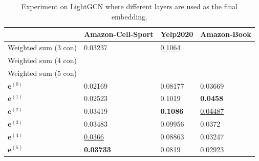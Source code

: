\begin{table}[]
    \begin{tabular}{|l|l|l|l|}
        \hline
                             & Amazon-Cell-Sport  & Yelp2020           & Amazon-Book         \\ \hline
        Weighted sum (3 con) & 0.03237            & \underline{0.1064} &                     \\ \hline
        Weighted sum (4 con) &                    &                    &                     \\ \hline
        Weighted sum (5 con) &                    &                    &                     \\ \hline
        $\mathbf{e}^{(0)}$   & 0.02169            & 0.08177            & 0.03669             \\ \hline
        $\mathbf{e}^{(1)}$   & 0.02523            & 0.1019             & \textbf{0.0458}     \\ \hline
        $\mathbf{e}^{(2)}$   & 0.03419            & \textbf{0.1086}    & \underline{0.04487} \\ \hline
        $\mathbf{e}^{(3)}$   & 0.03483            & 0.09956            & 0.0372              \\ \hline
        $\mathbf{e}^{(4)}$   & \underline{0.0366} & 0.08863            & 0.03247             \\ \hline
        $\mathbf{e}^{(5)}$   & \textbf{0.03733}   & 0.0819             & 0.02923             \\ \hline
    \end{tabular}
    \centering
    \caption{Experiment on LightGCN where different layers are used as the final embedding.}
    \label{tab:only-use-one-layer-experiment}
\end{table}